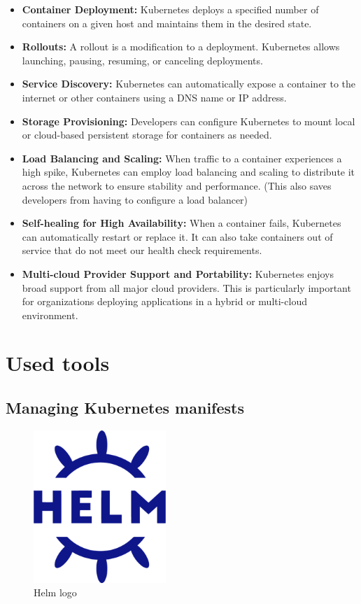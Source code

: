 \begin{itemize}
    \item \textbf{Container Deployment:} Kubernetes deploys a specified number of containers on a given host and maintains them in the desired state.
    \item \textbf{Rollouts:} A rollout is a modification to a deployment. Kubernetes allows launching, pausing, resuming, or canceling deployments.
    \item \textbf{Service Discovery:} Kubernetes can automatically expose a container to the internet or other containers using a DNS name or IP address.
    \item \textbf{Storage Provisioning:} Developers can configure Kubernetes to mount local or cloud-based persistent storage for containers as needed.
    \item \textbf{Load Balancing and Scaling:} When traffic to a container experiences a high spike, Kubernetes can employ load balancing and scaling to distribute it across the network to ensure stability and performance. (This also saves developers from having to configure a load balancer)
    \item \textbf{Self-healing for High Availability:} When a container fails, Kubernetes can automatically restart or replace it. It can also take containers out of service that do not meet our health check requirements.
    \item \textbf{Multi-cloud Provider Support and Portability:} Kubernetes enjoys broad support from all major cloud providers. This is particularly important for organizations deploying applications in a hybrid or multi-cloud environment.
\end{itemize}

\section{Used tools}

\subsection{Managing Kubernetes manifests}

\begin{figure}[H]
  \centering
  \includegraphics[width=5cm]{Figures/helm-logo.png}
  \caption[]{Helm logo}
  \label{fig:helm}
\end{figure}


